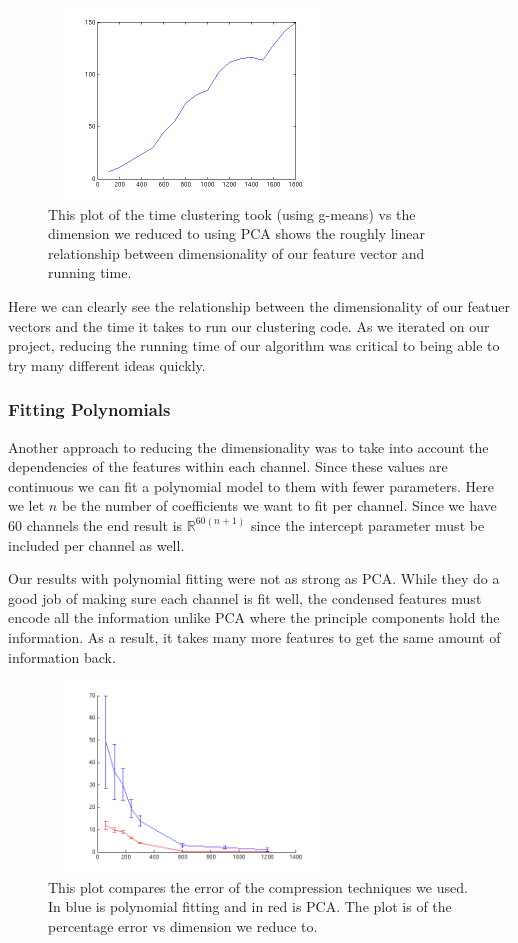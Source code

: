 \documentclass[conference]{IEEEtran}
\begin{document}
\begin{figure}
\centering
\includegraphics[width=3in,height=2in]{../poster/images/dim_vs_runningtime.png} 
\caption{This plot of the time clustering took (using g-means) vs the
  dimension we reduced to using PCA shows the roughly linear relationship 
between dimensionality of our feature vector and running
time.}
\end{figure}

Here we can clearly see the relationship between the dimensionality of our
featuer vectors and the time it takes to run our clustering code. As we
iterated on our project, reducing the running time of our algorithm was
critical to being able to try many different ideas quickly.

\subsubsection{Fitting Polynomials}

Another approach to reducing the dimensionality was to take
into account the dependencies of the features within each
channel. Since these values are continuous we can fit a
polynomial model to them with fewer parameters. Here we let $n$
be the number of coefficients we want to fit per channel. Since
we have 60 channels the end result is $\mathbb{R}^{60(n+1)}$
since the intercept parameter must be included per channel as well.

Our results with polynomial fitting were not as strong as
PCA. While they do a good job of making sure each channel is
fit well, the condensed features must encode all the
information unlike PCA where the principle components hold the
information. As a result, it takes many more features to get
the same amount of information back.

\begin{figure}
\centering
\includegraphics[width=3in,height=2in]{../poster/images/error_poly_pca.png}
\caption{This plot compares the error of the compression techniques we
  used. In blue is polynomial fitting and in red is PCA. The plot is of
  the percentage error vs dimension we reduce to.}
\end{figure}
\end{document}
